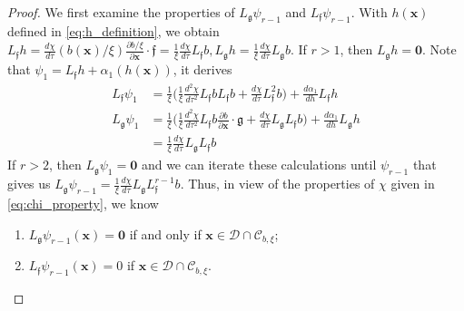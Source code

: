 \documentclass[letterpaper, 10 pt, journal, twoside]{IEEEtran}
\theoremstyle{plain}
\newcommand{\myvar}[1]{\bm{#1}}
\newcommand{\myset}[1]{\mathscr{#1}}
\begin{document}
\begin{proof}
 We first examine the properties of $L_{\mathfrak{g}} \psi_{r-1}$ and $L_{\mathfrak{f}} \psi_{r-1}$. With $h(\myvar{x})$ defined in \eqref{eq:h_definition}, we obtain $L_{\mathfrak{f}}h  = \tfrac{d\chi}{d\tau}(b(\myvar{x})/\xi) \tfrac{\partial b/\xi}{\partial \myvar{x}}\cdot \mathfrak{f} = \tfrac{1}{\xi}\tfrac{d\chi}{d\tau} L_{\mathfrak{f}}b,
         L_{\mathfrak{g}} h =  \tfrac{1}{\xi}\tfrac{d\chi}{d\tau} L_{\mathfrak{g}}b.$
If $r > 1$, then $  L_{\mathfrak{g}} h = \myvar{0}$. Note that $\psi_1 = L_{\mathfrak{f}}h + \alpha_1(h(\myvar{x})) $, it derives
\begin{equation}
    \begin{aligned}
        L_{\mathfrak{f}}\psi_1 &  = \tfrac{1}{\xi} \big(  \tfrac{1}{\xi} \tfrac{d^2 \chi}{d \tau^2} L_{\mathfrak{f}}b L_{\mathfrak{f}}b + \tfrac{d\chi}{d\tau}L^2_{\mathfrak{f}}b \big) + \tfrac{d\alpha_1}{dh} L_{\mathfrak{f}}h \\
        L_{\mathfrak{g}} \psi_1 & =  \tfrac{1}{\xi} \big( \tfrac{1}{\xi} \tfrac{d^2 \chi}{d \tau^2}  L_{\mathfrak{f}}b   \tfrac{\partial b}{ \partial \myvar{x}} \cdot \mathfrak{g} + \tfrac{d \chi}{d \tau} L_{\mathfrak{g}} L_{\mathfrak{f}}b \big) + \tfrac{d\alpha_1}{d h} L_{\mathfrak{g}} h \\
        & = \tfrac{1}{\xi} \tfrac{d\chi}{d\tau}L_{\mathfrak{g}}L_{\mathfrak{f}}b
    \end{aligned}
\end{equation}
If $r>2$, then $L_{\mathfrak{g}} \psi_1 = \myvar{0}$ and we can iterate these calculations until $\psi_{r-1}$ that gives us $       L_{\mathfrak{g}}\psi_{r-1}  = \tfrac{1}{\xi} \tfrac{d\chi}{d\tau}L_{\mathfrak{g}}L_{\mathfrak{f}}^{r-1} b.$
Thus, in view of the properties of $\chi$ given in \eqref{eq:chi_property},  we know
\begin{enumerate}
    \item $ L_{\mathfrak{g}}\psi_{r-1} (\myvar{x}) = \myvar{0}$ if and only if  $\myvar{x} \in \myset{D}\cap \myset{C}_{b,\xi}$;
    \item $ L_{\mathfrak{f}}\psi_{r-1}(\myvar{x})  = 0$ if $ \myvar{x} \in \myset{D}\cap \myset{C}_{b,\xi}$.
\end{enumerate}
 

\end{proof}
\end{document}
